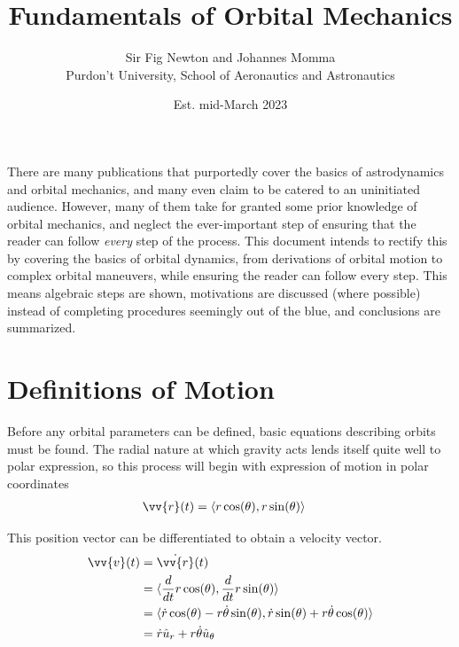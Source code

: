 \documentclass{article}
\title{Fundamentals of Orbital Mechanics}
\author{Sir Fig Newton and Johannes Momma\\Purdon't University, School of Aeronautics and Astronautics}
\date{Est. mid-March 2023}
\begin{document}
\maketitle

There are many publications that purportedly cover the basics of astrodynamics and orbital mechanics, and many even claim to be catered to an uninitiated audience. However, many of them take for granted some prior knowledge of orbital mechanics, and neglect the ever-important step of ensuring that the reader can follow \textit{every} step of the process. This document intends to rectify this by covering the basics of orbital dynamics, from derivations of orbital motion to complex orbital maneuvers, while ensuring the reader can follow every step. This means algebraic steps are shown, motivations are discussed (where possible) instead of completing procedures seemingly out of the blue, and conclusions are summarized.

\pagebreak
\tableofcontents

\pagebreak
\section{Definitions of Motion}

Before any orbital parameters can be defined, basic equations describing orbits must be found. The radial nature at which gravity acts lends itself quite well to polar expression, so this process will begin with expression of motion in polar coordinates
\begin{align*}
    \vv{r}(t) & =\langle{}r\cos(\theta), r\sin(\theta)\rangle{}
\end{align*}

This position vector can be differentiated to obtain a velocity vector.
\begin{align*}
    \vv{v}(t) & =\dot{\vv{r}}(t)                                                                                                \\
              & =\langle{}\frac{d}{dt}r\cos(\theta), \frac{d}{dt}r\sin(\theta)\rangle{}                                         \\
              & =\langle{}\dot{r}\cos(\theta)-r\dot{\theta}\sin(\theta), \dot{r}\sin(\theta)+r\dot{\theta}\cos(\theta)\rangle{} \\
              & =\dot{r}\hat{u}_r+r\dot{\theta}\hat{u}_\theta
\end{align*}
\end{document}

